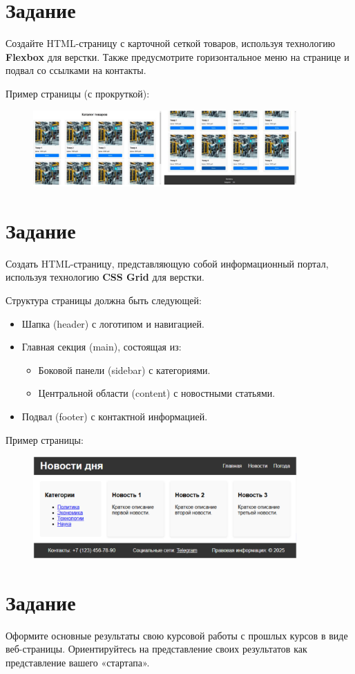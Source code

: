 \documentclass[a4paper,12pt]{extarticle}
\begin{document}
\section{Задание}
Создайте HTML-страницу с карточной сеткой товаров, используя технологию \textbf{Flexbox} для верстки. Также предусмотрите горизонтальное меню на странице и подвал со ссылками на контакты.

Пример страницы (с прокруткой):
\begin{figure}[!ht]
    \centering
    \includegraphics[width=0.9\textwidth]{lab2_task6.png}
\end{figure}

\section{Задание}
Создать HTML-страницу, представляющую собой информационный портал, используя технологию \textbf{CSS Grid} для верстки. 

Структура страницы должна быть следующей:
\begin{itemize}
  \item Шапка (header) с логотипом и навигацией.
  \item Главная секция (main), состоящая из:
  \begin{itemize}
    \item Боковой панели (sidebar) с категориями.
    \item Центральной области (content) с новостными статьями.
  \end{itemize}
  \item Подвал (footer) с контактной информацией.
\end{itemize}

Пример страницы:
\begin{figure}[!ht]
    \centering
    \includegraphics[width=0.9\textwidth]{lab2_task7.png}
\end{figure}

\section{Задание}
Оформите основные результаты свою курсовой работы с прошлых курсов в виде веб-страницы. Ориентируйтесь на представление своих результатов как представление вашего «стартапа».
\end{document}
